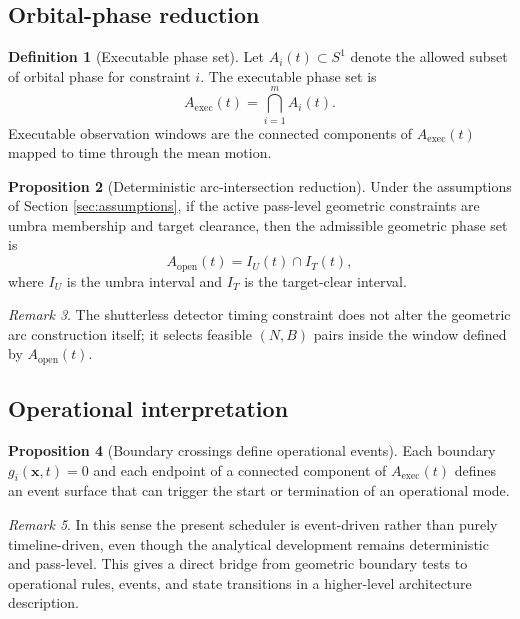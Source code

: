\documentclass[preprint,12pt]{elsarticle}
\theoremstyle{definition}
\newtheorem{definition}{Definition}[section]
\newtheorem{proposition}[definition]{Proposition}
\theoremstyle{remark}
\newtheorem{remark}[definition]{Remark}
\begin{document}
\subsection{Orbital-phase reduction}

\begin{definition}[Executable phase set]
Let $A_i(t)\subset S^1$ denote the allowed subset of orbital phase for constraint $i$.
The executable phase set is
\begin{equation}
A_{\mathrm{exec}}(t)=\bigcap_{i=1}^{m}A_i(t).
\label{eq:Aexec}
\end{equation}
Executable observation windows are the connected components of $A_{\mathrm{exec}}(t)$ mapped to time through the mean motion.
\end{definition}

\begin{proposition}[Deterministic arc-intersection reduction]
Under the assumptions of Section \ref{sec:assumptions}, if the active pass-level geometric constraints are umbra membership and target clearance, then the admissible geometric phase set is
\begin{equation}
A_{\mathrm{open}}(t)=I_U(t)\cap I_T(t),
\label{eq:Aopen}
\end{equation}
where $I_U$ is the umbra interval and $I_T$ is the target-clear interval.
\end{proposition}

\begin{remark}
The shutterless detector timing constraint does not alter the geometric arc construction itself; it selects feasible $(N,B)$ pairs inside the window defined by $A_{\mathrm{open}}(t)$.
\end{remark}

\subsection{Operational interpretation}

\begin{proposition}[Boundary crossings define operational events]
Each boundary $g_i(\mathbf{x},t)=0$ and each endpoint of a connected component of $A_{\mathrm{exec}}(t)$ defines an event surface that can trigger the start or termination of an operational mode.
\end{proposition}

\begin{remark}
In this sense the present scheduler is event-driven rather than purely timeline-driven, even though the analytical development remains deterministic and pass-level.
This gives a direct bridge from geometric boundary tests to operational rules, events, and state transitions in a higher-level architecture description.
\end{remark}
\end{document}
